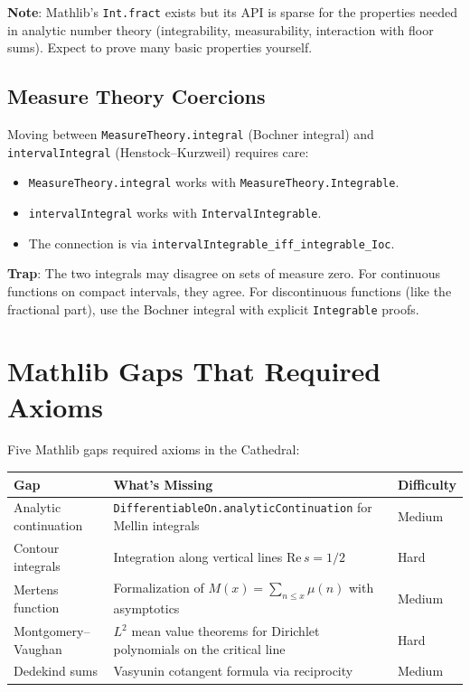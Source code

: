\documentclass[11pt,a4paper]{article}
\newcommand{\lean}[1]{\texttt{#1}}
\begin{document}
\textbf{Note}: Mathlib's \lean{Int.fract} exists but its API is
sparse for the properties needed in analytic number theory
(integrability, measurability, interaction with floor sums).
Expect to prove many basic properties yourself.

\subsection{Measure Theory Coercions}

Moving between \lean{MeasureTheory.integral} (Bochner integral) and
\lean{intervalIntegral} (Henstock--Kurzweil) requires care:

\begin{itemize}
  \item \lean{MeasureTheory.integral} works with
    \lean{MeasureTheory.Integrable}.
  \item \lean{intervalIntegral} works with
    \lean{IntervalIntegrable}.
  \item The connection is via
    \lean{intervalIntegrable\_iff\_integrable\_Ioc}.
\end{itemize}

\textbf{Trap}: The two integrals may disagree on sets of measure zero.
For continuous functions on compact intervals, they agree. For
discontinuous functions (like the fractional part), use the Bochner
integral with explicit \lean{Integrable} proofs.

\section{Mathlib Gaps That Required Axioms}
\label{sec:gaps}

Five Mathlib gaps required axioms in the Cathedral:

\begin{center}
\begin{tabular}{@{}lp{6cm}l@{}}
\toprule
\textbf{Gap} & \textbf{What's Missing} & \textbf{Difficulty} \\
\midrule
Analytic continuation & \lean{DifferentiableOn.analyticContinuation}
  for Mellin integrals & Medium \\
Contour integrals & Integration along vertical lines
  $\mathrm{Re}\,s = 1/2$ & Hard \\
Mertens function & Formalization of $M(x) = \sum_{n \leq x} \mu(n)$
  with asymptotics & Medium \\
Montgomery--Vaughan & $L^2$ mean value theorems for Dirichlet
  polynomials on the critical line & Hard \\
Dedekind sums & Vasyunin cotangent formula via reciprocity & Medium \\
\bottomrule
\end{tabular}
\end{center}
\end{document}
